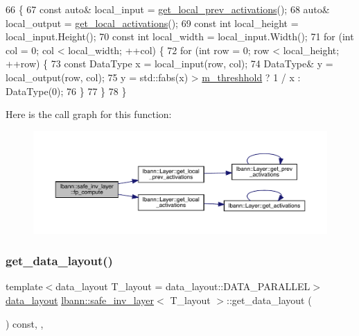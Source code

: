 \begin{DoxyCode}
66                              \{
67     \textcolor{keyword}{const} \textcolor{keyword}{auto}& local\_input = \hyperlink{classlbann_1_1Layer_a35397843bb0c84030000c7d872229acb}{get\_local\_prev\_activations}();
68     \textcolor{keyword}{auto}& local\_output = \hyperlink{classlbann_1_1Layer_a4248f27acebf72b7b7b3ee39c8bcb62a}{get\_local\_activations}();
69     \textcolor{keyword}{const} \textcolor{keywordtype}{int} local\_height = local\_input.Height();
70     \textcolor{keyword}{const} \textcolor{keywordtype}{int} local\_width = local\_input.Width();
71     \textcolor{keywordflow}{for} (\textcolor{keywordtype}{int} col = 0; col < local\_width; ++col) \{
72       \textcolor{keywordflow}{for} (\textcolor{keywordtype}{int} row = 0; row < local\_height; ++row) \{
73         \textcolor{keyword}{const} DataType x = local\_input(row, col);
74         DataType& y = local\_output(row, col);
75         y = std::fabs(x) > \hyperlink{classlbann_1_1safe__inv__layer_ae8978232b726f450b961a63e5ff33279}{m\_threshhold} ? 1 / x : DataType(0);
76       \}
77     \}
78   \}
\end{DoxyCode}
Here is the call graph for this function\+:\nopagebreak
\begin{figure}[H]
\begin{center}
\leavevmode
\includegraphics[width=350pt]{classlbann_1_1safe__inv__layer_a070fe64c2a605eb5624d509740de1c32_cgraph}
\end{center}
\end{figure}
\mbox{\label{classlbann_1_1safe__inv__layer_aa82e763a902004d7b0f05b390c3bd45f}} 
\subsubsection{\texorpdfstring{get\+\_\+data\+\_\+layout()}{get\_data\_layout()}}
{\footnotesize\ttfamily template$<$data\+\_\+layout T\+\_\+layout = data\+\_\+layout\+::\+D\+A\+T\+A\+\_\+\+P\+A\+R\+A\+L\+L\+EL$>$ \\
\hyperlink{base_8hpp_a786677cbfb3f5677b4d84f3056eb08db}{data\+\_\+layout} \hyperlink{classlbann_1_1safe__inv__layer}{lbann\+::safe\+\_\+inv\+\_\+layer}$<$ T\+\_\+layout $>$\+::get\+\_\+data\+\_\+layout (\begin{DoxyParamCaption}{ }\end{DoxyParamCaption}) const\hspace{0.3cm}{\ttfamily [inline]}, {\ttfamily [override]}, {\ttfamily [virtual]}}

